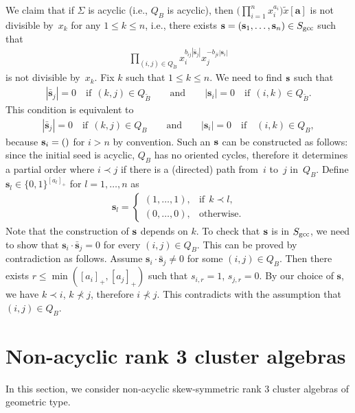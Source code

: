 \documentclass[pdftex]{sigma}
\numberwithin{equation}{section}
\begin{document}
\begin{Remark}
We claim that if $\Sigma$ is acyclic (i.e., $Q_B$ is acyclic), then $\big(\prod\limits_{i=1}^n  x_i^{a_i}\big)\tilde{x}[\mathbf{a}]$ is not divisible by~$x_k$ for any $1\le k\le n$, i.e.,  there exists  $\mathbf{s}=(\mathbf{s}_1,\dots,\mathbf{s}_n)\in S_{\rm gcc}$  such that
\begin{gather*}
\prod_{(i,j)\in Q_{\tilde B}}  x_{i}^{b_{ij}|\bar{\mathbf{s}}_j|} x_{j}^{-b_{ji}|\mathbf{s}_i|}
\end{gather*}
is not divisible by~$x_k$.
Fix $k$ such that $1\le k\le n$. We need to f\/ind ${\bf s}$ such that
\begin{gather*}
 |\bar{\mathbf{s}}_j|=0 \quad \text{if} \ \ (k,j)\in Q_{\tilde B} \qquad \text{and} \qquad |\mathbf{s}_i|=0 \quad \text{if} \ \ (i,k)\in Q_{\tilde B}.
\end{gather*}
This condition is equivalent to
\begin{gather*}
|\bar{\mathbf{s}}_j|=0 \quad \text{if} \ \ (k,j)\in Q_B \qquad \text{and} \qquad |\mathbf{s}_i|=0 \quad \text{if} \quad (i,k)\in Q_B,
\end{gather*}
because ${\bf s}_i=()$ for $i>n$ by convention.
Such  an ${\bf s}$ can be constructed as follows: since  the initial seed is acyclic, $Q_B$ has no oriented cycles, therefore it determines a partial order where $i\prec j$ if there is a (directed) path from~$i$ to~$j$ in~$Q_B$. Def\/ine
$\mathbf{s}_l\in\{0,1\}^{[a_l]_+}$ for $l=1,\dots,n$ as
\begin{gather*}
\mathbf{s}_l=\begin{cases}
(1,\dots,1),& \textrm{if} \ \ k\prec l,\\
(0,\dots,0),& \textrm{otherwise}.
\end{cases}
\end{gather*}
Note that the construction of ${\bf s}$ depends on $k$. To check that ${\bf s}$ is in $S_{\rm gcc}$, we need to show that $\mathbf{s}_i\cdot\bar{\mathbf{s}}_j=0$ for every $(i,j)\in Q_B$. This can be proved by contradiction as follows.
Assume $\mathbf{s}_i\cdot\bar{\mathbf{s}}_j\neq 0$ for some $(i,j)\in Q_B$.
Then there exists $r\le\min([a_i]_+,[a_j]_+)$ such that $s_{i,r}=1$, $s_{j,r}=0$. By our choice of $\mathbf{s}$, we have $k\prec i$, $k\not\prec j$, therefore $i\not\prec j$. This contradicts with the assumption that $(i,j)\in Q_B$.
\end{Remark}



\section{Non-acyclic rank 3 cluster algebras}\label{section4}
In this section, we consider non-acyclic skew-symmetric rank 3 cluster algebras of geometric type.
\end{document}
